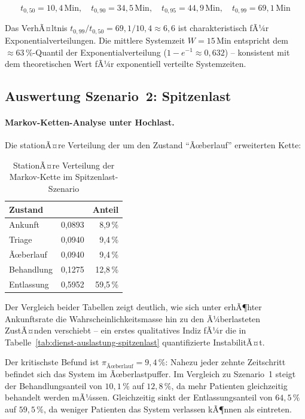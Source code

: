 ﻿\documentclass[a4paper,12pt]{report}
\theoremstyle{definition}
\begin{document}
\begin{equation}
	t_{0{,}50} = 10{,}4\,\text{Min}, \quad
	t_{0{,}90} = 34{,}5\,\text{Min}, \quad
	t_{0{,}95} = 44{,}9\,\text{Min}, \quad
	t_{0{,}99} = 69{,}1\,\text{Min}
\end{equation}

Das VerhÃ¤ltnis $t_{0{,}99}/t_{0{,}50} = 69{,}1/10{,}4 \approx 6{,}6$ ist
charakteristisch fÃ¼r Exponentialverteilungen. Die mittlere Systemzeit
$W = 15$\,Min entspricht dem $\approx 63$\,\%-Quantil der Exponentialverteilung
($1 - e^{-1} \approx 0{,}632$) -- konsistent mit dem theoretischen Wert fÃ¼r
exponentiell verteilte Systemzeiten.

\subsection{Auswertung Szenario~2: Spitzenlast}

\paragraph{Markov-Ketten-Analyse unter Hochlast.}
Die stationÃ¤re Verteilung der um den Zustand ``Ãœberlauf'' erweiterten Kette:

\begin{table}[H]
	\centering
	\begin{tabular}{@{}lrr@{}}
		\toprule
		\textbf{Zustand} & \boldmath{$\pi_i$} & \textbf{Anteil} \\
		\midrule
		Ankunft     & 0{,}0893 &  8{,}9\,\% \\
		Triage      & 0{,}0940 &  9{,}4\,\% \\
		Ãœberlauf    & 0{,}0940 &  9{,}4\,\% \\
		Behandlung  & 0{,}1275 & 12{,}8\,\% \\
		Entlassung  & 0{,}5952 & 59{,}5\,\% \\
		\bottomrule
	\end{tabular}
	\caption{StationÃ¤re Verteilung der Markov-Kette im Spitzenlast-Szenario}
\label{tab:stationaer-spitzenlast}
	\label{tab:pi-hochlast}
\end{table}

Der Vergleich beider Tabellen zeigt deutlich, wie sich unter erhÃ¶hter Ankunftsrate die Wahrscheinlichkeitsmasse hin zu den Ã¼berlasteten ZustÃ¤nden verschiebt -- ein erstes qualitatives Indiz fÃ¼r die in Tabelle~\ref{tab:dienst-auslastung-spitzenlast} quantifizierte InstabilitÃ¤t.

Der kritischste Befund ist $\pi_\text{Ãœberlauf} = 9{,}4\,\%$: Nahezu jeder
zehnte Zeitschritt befindet sich das System im Ãœberlastpuffer. Im Vergleich
zu Szenario~1 steigt der Behandlungsanteil von $10{,}1\,\%$ auf $12{,}8\,\%$,
da mehr Patienten gleichzeitig behandelt werden mÃ¼ssen. Gleichzeitig sinkt
der Entlassungsanteil von $64{,}5\,\%$ auf $59{,}5\,\%$, da weniger Patienten
das System verlassen kÃ¶nnen als eintreten.
\end{document}
